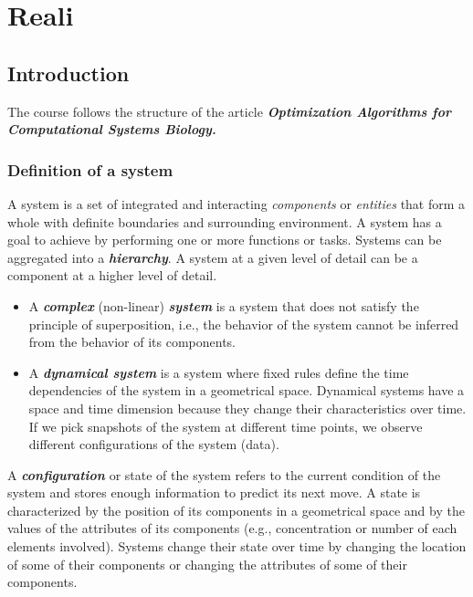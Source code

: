 \graphicspath{{chapters/07/images/}}
\chapter{Reali}

\hypertarget{introduction}{%
\section{Introduction}\label{introduction}}

The course follows the structure of the article
\textbf{\emph{Optimization Algorithms for Computational Systems
Biology.}}

\hypertarget{definition-of-a-system}{%
\subsection{Definition of a system}\label{definition-of-a-system}}

A system is a set of integrated and interacting \emph{components} or
\emph{entities} that form a whole with definite boundaries and
surrounding environment. A system has a goal to achieve by performing
one or more functions or tasks. Systems can be aggregated into a
\textbf{\emph{hierarchy}}. A system at a given level of detail can be a
component at a higher level of detail.

\begin{itemize}
\tightlist
\item
  A \textbf{\emph{complex}} (non-linear) \textbf{\emph{system}} is a
  system that does not satisfy the principle of superposition, i.e., the
  behavior of the system cannot be inferred from the behavior of its
  components.
\item
  A \textbf{\emph{dynamical system}} is a system where fixed rules
  define the time dependencies of the system in a geometrical space.
  Dynamical systems have a space and time dimension because they change
  their characteristics over time. If we pick snapshots of the system at
  different time points, we observe different configurations of the
  system (data).
\end{itemize}

A \textbf{\emph{configuration}} or state of the system refers to the
current condition of the system and stores enough information to predict
its next move. A state is characterized by the position of its
components in a geometrical space and by the values of the attributes of
its components (e.g., concentration or number of each elements
involved). Systems change their state over time by changing the location
of some of their components or changing the attributes of some of their
components.

